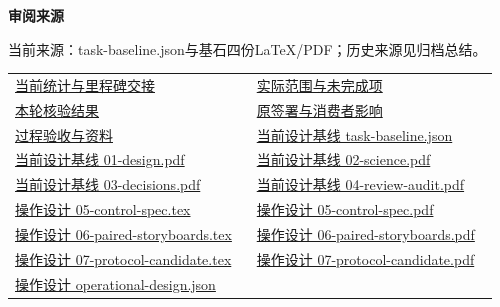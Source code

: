 \documentclass[11pt,a4paper]{article}
\newcommand{\reviewsubsection}[1]{\par\Needspace{4\baselineskip}\vspace{4pt}\begin{center}{\titlelatin\titlecjk\bfseries\fontsize{12}{18}\selectfont #1}\end{center}}
\begin{document}
\begin{minipage}{\linewidth}
\reviewsubsection{3.4 审阅来源}
当前来源：task-\allowbreak{}baseline.json与基石四份LaTeX/\allowbreak{}PDF；历史来源见归档总结。


\begingroup\small\setlength{\tabcolsep}{4pt}\begin{tabular}{@{}p{0.48\linewidth}p{0.48\linewidth}@{}}
\href{file:///D:/Agent/srp/agent/tasks/A-03/outputs/current-statistics.md}{当前统计与里程碑交接} & \href{file:///D:/Agent/srp/agent/tasks/A-03/outputs/current-statistics.json}{实际范围与未完成项}\\[4pt]
\href{file:///D:/Agent/srp/agent/tasks/A-03/evidence/verification.json}{本轮核验结果} & \href{file:///D:/Agent/srp/agent/tasks/A-03/evidence/consumer-impact.md}{原签署与消费者影响}\\[4pt]
\href{file:///D:/Agent/srp/agent/tasks/A-03/TASK.md}{过程验收与资料} & \href{file:///D:/Agent/srp/agent/design/design-foundation-20261008/task-baseline.json}{当前设计基线 task-\allowbreak{}baseline.json}\\[4pt]
\href{file:///D:/Agent/srp/agent/design/design-foundation-20261008/01-design.pdf}{当前设计基线 01-\allowbreak{}design.pdf} & \href{file:///D:/Agent/srp/agent/design/design-foundation-20261008/02-science.pdf}{当前设计基线 02-\allowbreak{}science.pdf}\\[4pt]
\href{file:///D:/Agent/srp/agent/design/design-foundation-20261008/03-decisions.pdf}{当前设计基线 03-\allowbreak{}decisions.pdf} & \href{file:///D:/Agent/srp/agent/design/design-foundation-20261008/04-review-audit.pdf}{当前设计基线 04-\allowbreak{}review-\allowbreak{}audit.pdf}\\[4pt]
\href{file:///D:/Agent/srp/agent/design/design-foundation-20261008/05-control-spec.tex}{操作设计 05-\allowbreak{}control-\allowbreak{}spec.tex} & \href{file:///D:/Agent/srp/agent/design/design-foundation-20261008/05-control-spec.pdf}{操作设计 05-\allowbreak{}control-\allowbreak{}spec.pdf}\\[4pt]
\href{file:///D:/Agent/srp/agent/design/design-foundation-20261008/06-paired-storyboards.tex}{操作设计 06-\allowbreak{}paired-\allowbreak{}storyboards.tex} & \href{file:///D:/Agent/srp/agent/design/design-foundation-20261008/06-paired-storyboards.pdf}{操作设计 06-\allowbreak{}paired-\allowbreak{}storyboards.pdf}\\[4pt]
\href{file:///D:/Agent/srp/agent/design/design-foundation-20261008/07-protocol-candidate.tex}{操作设计 07-\allowbreak{}protocol-\allowbreak{}candidate.tex} & \href{file:///D:/Agent/srp/agent/design/design-foundation-20261008/07-protocol-candidate.pdf}{操作设计 07-\allowbreak{}protocol-\allowbreak{}candidate.pdf}\\[4pt]
\href{file:///D:/Agent/srp/agent/design/design-foundation-20261008/operational-design.json}{操作设计 operational-\allowbreak{}design.json} & \\[4pt]
\end{tabular}\endgroup\end{minipage}\par
\end{document}
